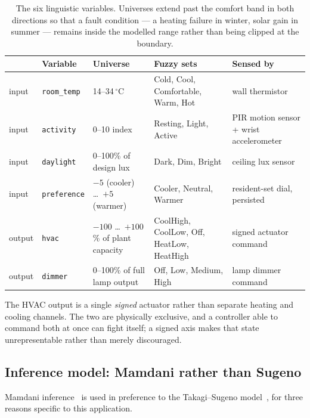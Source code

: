 \begin{table}[t]
\caption{The six linguistic variables. Universes extend past the comfort band
in both directions so that a fault condition --- a heating failure in winter,
solar gain in summer --- remains inside the modelled range rather than being
clipped at the boundary.}
\label{tab:t2-variables}
\centering
\small
\begin{tabular}{@{}lp{}p{}p{}p{}@{}}
\toprule
& \textbf{Variable} & \textbf{Universe} & \textbf{Fuzzy sets} &
\textbf{Sensed by} \\
\midrule
input  & \texttt{room\_temp}  & 14--34\,$^{\circ}$C
       & Cold, Cool, Comfortable, Warm, Hot
       & wall thermistor \\
input  & \texttt{activity}    & 0--10 index
       & Resting, Light, Active
       & PIR motion sensor + wrist accelerometer \\
input  & \texttt{daylight}    & 0--100\% of design lux
       & Dark, Dim, Bright
       & ceiling lux sensor \\
input  & \texttt{preference}  & $-5$ (cooler) \ldots\ $+5$ (warmer)
       & Cooler, Neutral, Warmer
       & resident-set dial, persisted \\
\midrule
output & \texttt{hvac}        & $-100$ \ldots\ $+100$\% of plant capacity
       & CoolHigh, CoolLow, Off, HeatLow, HeatHigh
       & signed actuator command \\
output & \texttt{dimmer}      & 0--100\% of full lamp output
       & Off, Low, Medium, High
       & lamp dimmer command \\
\bottomrule
\end{tabular}
\end{table}

The HVAC output is a single \emph{signed} actuator rather than separate heating
and cooling channels. The two are physically exclusive, and a controller able to
command both at once can fight itself; a signed axis makes that state
unrepresentable rather than merely discouraged.

\subsection{Inference model: Mamdani rather than Sugeno}

Mamdani inference~\cite{mamdani1975} is used in preference to the
Takagi--Sugeno model~\cite{takagi1985}, for three reasons specific to this
application.

